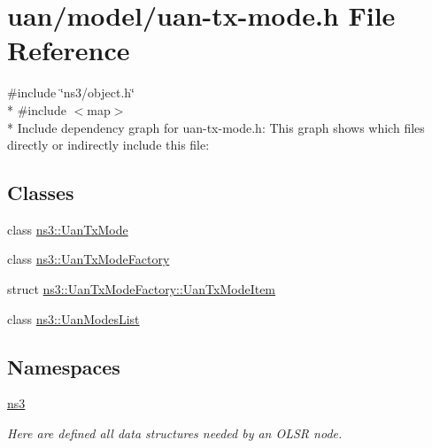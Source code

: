 \hypertarget{uan-tx-mode_8h}{}\section{uan/model/uan-\/tx-\/mode.h File Reference}
\label{uan-tx-mode_8h}
{\ttfamily \#include \char`\"{}ns3/object.\+h\char`\"{}}\\*
{\ttfamily \#include $<$map$>$}\\*
Include dependency graph for uan-\/tx-\/mode.h\+:
This graph shows which files directly or indirectly include this file\+:
\subsection*{Classes}
\begin{DoxyCompactItemize}
\item 
class \hyperlink{classns3_1_1UanTxMode}{ns3\+::\+Uan\+Tx\+Mode}
\item 
class \hyperlink{classns3_1_1UanTxModeFactory}{ns3\+::\+Uan\+Tx\+Mode\+Factory}
\item 
struct \hyperlink{structns3_1_1UanTxModeFactory_1_1UanTxModeItem}{ns3\+::\+Uan\+Tx\+Mode\+Factory\+::\+Uan\+Tx\+Mode\+Item}
\item 
class \hyperlink{classns3_1_1UanModesList}{ns3\+::\+Uan\+Modes\+List}
\end{DoxyCompactItemize}
\subsection*{Namespaces}
\begin{DoxyCompactItemize}
\item 
 \hyperlink{namespacens3}{ns3}
\begin{DoxyCompactList}\small\item\em Here are defined all data structures needed by an O\+L\+SR node. \end{DoxyCompactList}\end{DoxyCompactItemize}
